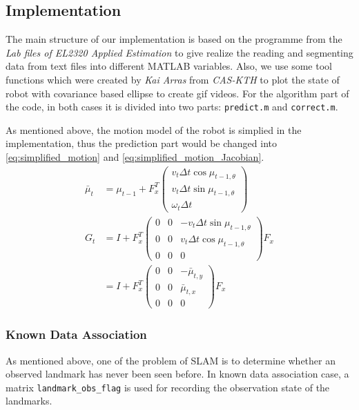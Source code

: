\documentclass[conference]{IEEEtran}
\begin{document}
\subsection{Implementation}
\par The main structure of our implementation is based on the programme from the \textit{Lab files of EL2320 Applied Estimation} to give realize the reading and segmenting data from text files into different MATLAB variables. Also, we use some tool functions which were created by \textit{Kai Arras} from \textit{CAS-KTH} to plot the state of robot with covariance based ellipse to create gif videos. For the algorithm part of the code, in both cases it is divided into two parts: \texttt{predict.m} and \texttt{correct.m}.
\par As mentioned above, the motion model of the robot is simplied in the implementation, thus the prediction part would be changed into \eqref{eq:simplified_motion} and \eqref{eq:simplified_motion_Jacobian}.
	\begin{align}
		\bar{\mu}_{t} & = \mu_{t-1} + F_{x}^{T} \begin{pmatrix} v_{t}\Delta{t}\cos{\mu_{t-1,\theta}} \\ v_{t}\Delta{t}\sin{\mu_{t-1,\theta}} \\ \omega_{t}\Delta{t} \end{pmatrix} \label{eq:simplified_motion} \\
		G_{t} & = I + F_{x}^{T} \begin{pmatrix} 0 & 0 & -v_{t}\Delta{t}\sin{\mu_{t-1,\theta}} \\ 0 & 0 & v_{t}\Delta{t}\cos{\mu_{t-1,\theta}} \\ 0 & 0 & 0 \end{pmatrix} F_{x} \nonumber \\
		& = I + F_{x}^{T} \begin{pmatrix} 0 & 0 & -\bar{\mu}_{t,y} \\ 0 & 0 & \bar{\mu}_{t,x} \\ 0 & 0 & 0 \end{pmatrix} F_{x} \label{eq:simplified_motion_Jacobian}
	\end{align}
% 
\subsubsection{Known Data Association}
\par As mentioned above, one of the problem of SLAM is to determine whether an observed landmark has never been seen before. In known data association case, a matrix \texttt{landmark\_obs\_flag} is used for recording the observation state of the landmarks.
% 
\end{document}
